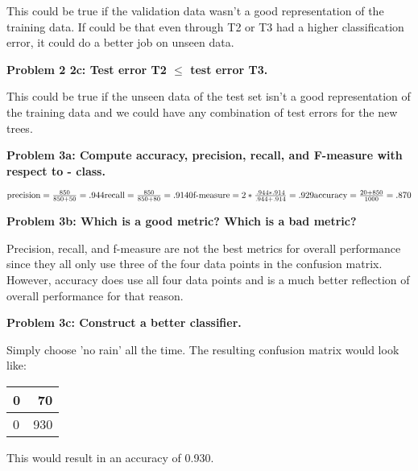 \documentclass[11pt]{article}
\numberwithin{equation}{section}  %
\begin{document}
This could be true if the validation data wasn't a good representation of the training data. If could be that even through T2 or T3 had a higher classification error, it could do a better job on unseen data.
\vspace*{0.25in}

\noindent\textbf{Problem 2 2c: Test error T2 $\le$ test error T3.}
\vspace*{0.25in}

This could be true if the unseen data of the test set isn't a good representation of the training data and we could have any combination of test errors for the new trees.
\vspace*{0.25in}

\noindent\textbf{Problem 3a: Compute accuracy, precision, recall, and F-measure with respect to - class.}
\vspace*{0.25in}

$\text{precision} = \frac{850}{850+50}=.944 \\
\text{recall} = \frac{850}{850+80}=.9140 \\
\text{f-measure} = 2 * \frac{.944 * .914}{.944 + .914} = .929 \\
\text{accuracy} = \frac{20+850}{1000} = .870$
\vspace*{0.25in}

\noindent\textbf{Problem 3b: Which is a good metric? Which is a bad metric?}
\vspace*{0.25in}

Precision, recall, and f-measure are not the best metrics for overall performance since they all only use three of the four data points in the confusion matrix. However, accuracy does use all four data points and is a much better reflection of overall performance for that reason.
\vspace*{0.25in}

\noindent\textbf{Problem 3c: Construct a better classifier.}
\vspace*{0.25in}

Simply choose 'no rain' all the time. The resulting confusion matrix would look like: \\
\begin{tabular}{| l | r | }
\hline			
  0 & 70 \\ \hline
  0 & 930 \\
\hline  
\end{tabular}

This would result in an accuracy of 0.930.
\vspace*{0.25in}
\end{document}
